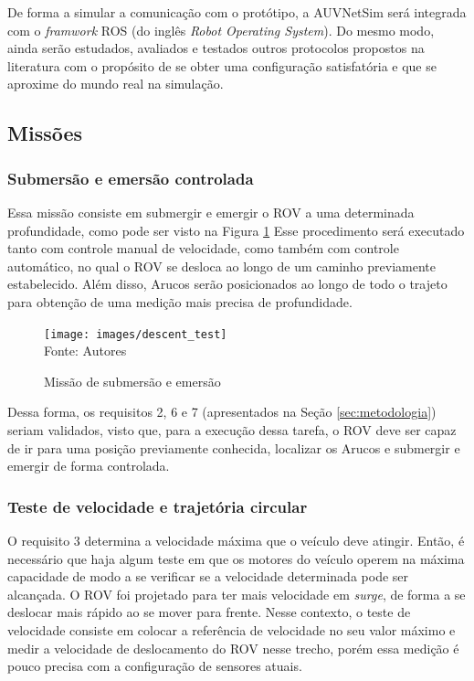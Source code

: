 De forma a simular a comunicação com o protótipo, a AUVNetSim será integrada com o \textit{framwork} ROS (do inglês \textit{Robot Operating System}). Do mesmo modo, ainda serão estudados, avaliados e testados outros protocolos propostos na literatura com o propósito de se obter uma configuração satisfatória e que se aproxime do mundo real na simulação.

\subsection{Missões}

\subsubsection*{Submersão e emersão controlada}
Essa missão consiste em submergir e emergir o ROV a uma determinada profundidade,
como pode ser visto na Figura \ref{fig:descenttest} Esse procedimento será executado tanto com controle manual de velocidade, como também com controle automático, no qual o ROV se desloca ao longo de um caminho previamente estabelecido. Além disso, Arucos serão posicionados ao longo de todo o trajeto para obtenção de uma medição mais precisa de profundidade.


\begin{figure}[h]
	\centering
	\caption{Missão de submersão e emersão}
	\label{fig:descenttest}
	\texttt{[image: images/descent\_test]}\\
	\footnotesize Fonte: Autores
\end{figure}


Dessa forma, os requisitos 2, 6 e 7 (apresentados na Seção \ref{sec:metodologia}) seriam validados, visto que, para a execução dessa tarefa, o ROV deve ser capaz de ir para uma posição previamente conhecida, localizar os Arucos e submergir e emergir de forma controlada.

\subsubsection*{Teste de velocidade e trajetória circular}

O requisito 3 determina a velocidade máxima que o veículo deve atingir. Então, é necessário que haja algum teste em que os motores do veículo operem na máxima capacidade de modo a se verificar se a velocidade determinada pode ser alcançada. O ROV foi projetado para ter mais velocidade em \textit{surge}, de forma a se deslocar mais rápido ao se mover para frente. Nesse contexto, o teste de velocidade consiste em colocar a referência de velocidade no seu valor máximo e medir a velocidade de deslocamento do ROV nesse trecho, porém essa medição é pouco precisa com a configuração de sensores atuais.

